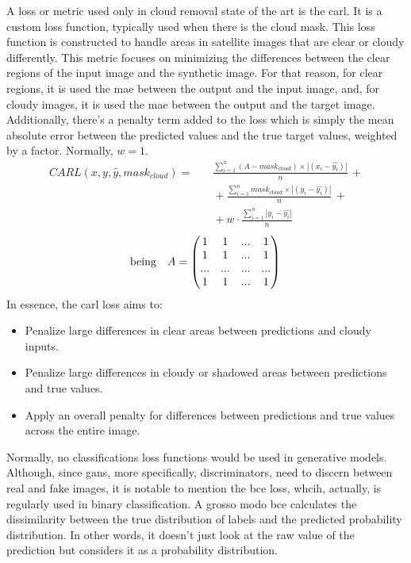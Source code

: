 A loss or metric used only in cloud removal state of the art is the \gls{carl}. It is a custom loss function, typically used when there is the cloud mask. This loss function is constructed to handle areas in satellite images that are clear or cloudy differently. This metric focuses on minimizing the differences between the clear regions of the input image and the synthetic image. For that reason, for clear regions, it is used the \gls{mae} between the output and the input image, and, for cloudy images, it is used the \gls{mae} between the output and the target image. Additionally, there's a penalty term added to the loss which is simply the mean absolute error between the predicted values and the true target values, weighted by a factor. Normally, $w = 1$.
\begin{align*}
	CARL(x, y, \hat{y}, mask_{cloud}) =& \quad  \frac{\sum_{i=1}^{n} (A - mask_{cloud}) \times |(x_i - \hat{y_i})|}{n} \, + \\  & \quad + \frac{\sum_{i=1}^{n} mask_{cloud} \times |(y_i - \hat{y_i})|}{n} \, + \\ & \quad + w \cdot \frac{\sum_{i=1}^{n} |y_i - \hat{y_i}| }{n}
\end{align*}
\[\text{being} \quad A = 
\begin{pmatrix}
	1 & 1 & ... & 1 \\
	1 & 1 & ... & 1 \\
	... & ... & ... & ... \\
	1 & 1 & ... & 1
\end{pmatrix}\\
\quad\\\]
In essence, the \gls{carl} loss aims to:
\begin{itemize}
	\item Penalize large differences in clear areas between predictions and cloudy inputs.
	\item Penalize large differences in cloudy or shadowed areas between predictions and true values.
	\item Apply an overall penalty for differences between predictions and true values across the entire image.
\end{itemize}
Normally, no classifications loss functions would be used in generative models. Although, since \gls{gan}s, more specifically, discriminators, need to discern between real and fake images, it is notable to mention the \gls{bce} loss, whcih, actually, is regularly used in binary classification. A grosso modo \gls{bce} calculates the dissimilarity between the true distribution of labels and the predicted probability distribution. In other words, it doesn't just look at the raw value of the prediction but considers it as a probability distribution. 

